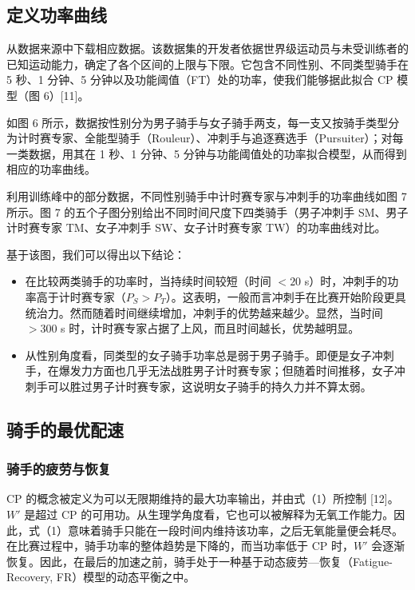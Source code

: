 \documentclass[11pt,a4paper]{ctexart}
\begin{document}
\subsection{定义功率曲线}

从数据来源中下载相应数据。该数据集的开发者依据世界级运动员与未受训练者的已知运动能力，确定了各个区间的上限与下限。它包含不同性别、不同类型骑手在 5 秒、1 分钟、5 分钟以及功能阈值（FT）处的功率，使我们能够据此拟合 CP 模型（图 6）[11]。

如图 6 所示，数据按性别分为男子骑手与女子骑手两支，每一支又按骑手类型分为计时赛专家、全能型骑手（Rouleur）、冲刺手与追逐赛选手（Pursuiter）；对每一类数据，用其在 1 秒、1 分钟、5 分钟与功能阈值处的功率拟合模型，从而得到相应的功率曲线。

利用训练峰中的部分数据，不同性别骑手中计时赛专家与冲刺手的功率曲线如图 7 所示。图 7 的五个子图分别给出不同时间尺度下四类骑手（男子冲刺手 SM、男子计时赛专家 TM、女子冲刺手 SW、女子计时赛专家 TW）的功率曲线对比。

基于该图，我们可以得出以下结论：

\begin{itemize}
\item 在比较两类骑手的功率时，当持续时间较短（时间 $<20$ s）时，冲刺手的功率高于计时赛专家（$P_S>P_T$）。这表明，一般而言冲刺手在比赛开始阶段更具统治力。然而随着时间继续增加，冲刺手的优势越来越少。显然，当时间 $>300$ s 时，计时赛专家占据了上风，而且时间越长，优势越明显。
\item 从性别角度看，同类型的女子骑手功率总是弱于男子骑手。即便是女子冲刺手，在爆发力方面也几乎无法战胜男子计时赛专家；但随着时间推移，女子冲刺手可以胜过男子计时赛专家，这说明女子骑手的持久力并不算太弱。
\end{itemize}

\subsection{骑手的最优配速}

\subsubsection{骑手的疲劳与恢复}

CP 的概念被定义为可以无限期维持的最大功率输出，并由式（1）所控制 [12]。$W'$ 是超过 CP 的可用功。从生理学角度看，它也可以被解释为无氧工作能力。因此，式（1）意味着骑手只能在一段时间内维持该功率，之后无氧能量便会耗尽。在比赛过程中，骑手功率的整体趋势是下降的，而当功率低于 CP 时，$W'$ 会逐渐恢复。因此，在最后的加速之前，骑手处于一种基于动态疲劳—恢复（Fatigue-Recovery, FR）模型的动态平衡之中。
\end{document}
